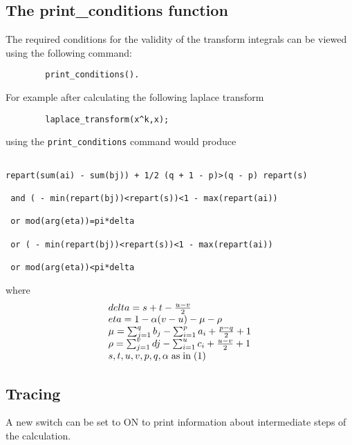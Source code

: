 \subsection{The print\_conditions function}

\rm The required conditions for the validity of the transform integrals
can be viewed using the following command:

\begin{verbatim}
        print_conditions().
\end{verbatim}

For example after calculating the following laplace transform

\begin{verbatim}
        laplace_transform(x^k,x);
\end{verbatim}

using the \verb+print_conditions+ command would produce

\begin{verbatim}
                         
repart(sum(ai) - sum(bj)) + 1/2 (q + 1 - p)>(q - p) repart(s)
                         
 and ( - min(repart(bj))<repart(s))<1 - max(repart(ai)) 

 or mod(arg(eta))=pi*delta

 or ( - min(repart(bj))<repart(s))<1 - max(repart(ai)) 

 or mod(arg(eta))<pi*delta

\end{verbatim}

where
\begin{displaymath}
\begin{array}{ll}
delta = s+t-\frac{u-v}{2}\\
eta = 1-\alpha(v-u)-\mu-\rho\\
\mu = \sum_{j=1}^{q} b_{j} - \sum_{i=1}^{p} a_{i} + \frac{p-q}{2} + 1\\
\rho = \sum_{j=1}^{v} d{j} - \sum_{i=1}^{u} c_{i} + \frac{u-v}{2} + 1\\
s,t,u,v,p,q,\alpha \; {\rm as \; in \; (1)}
\end{array}
\end{displaymath}


\subsection{Tracing}
\hypertarget{switch:TRDEFINT}{}

A new switch  can be set to ON to print information about intermediate steps 
of the calculation.

